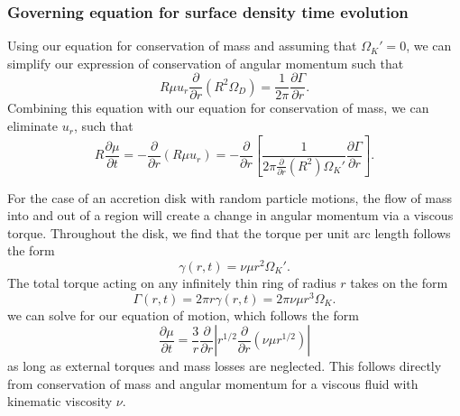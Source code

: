 \documentclass[aps,pra,twocolumn]{revtex4-1}
\begin{document}
\subsubsection{\label{section 2.1.3} Governing equation for surface density time evolution}
Using our equation for conservation of mass and assuming that $\Omega_K' = 0$, we can simplify our expression of conservation of angular momentum such that
\begin{equation}
R\mu u_r \frac{\partial}{\partial r} (R^2 \Omega_D) = \frac{1}{2\pi} \frac{\partial \Gamma}{\partial r}.
\end{equation}
Combining this equation with our equation for conservation of mass, we can eliminate $u_r$, such that
\begin{equation}
R \frac{\partial \mu}{\partial t} = -\frac{\partial}{\partial r}(R \mu u_r) = - \frac{\partial}{\partial r}\left[ \frac{1}{2\pi \frac{\partial}{\partial r}(R^2)\Omega_K'}\frac{\partial \Gamma}{\partial r} \right].
\end{equation}

For the case of an accretion disk with random particle motions, the flow of mass into and out of a region will create a change in angular momentum via a viscous torque.  Throughout the disk, we find that the torque per unit arc length follows the form \cite{king2002}
\begin{equation}
\gamma(r, t) = \nu \mu r^2 \Omega_K'.
\end{equation}
The total torque acting on any infinitely thin ring of radius $r$ takes on the form 
\begin{equation}
\Gamma(r, t) = 2 \pi r \gamma(r, t) = 2 \pi \nu \mu r^3 \Omega_K. \label{torque}
\end{equation}
we can solve for our equation of motion, which follows the form 
\begin{equation}
\frac{\partial \mu}{\partial t} = \frac{3}{r} \frac{\partial}{\partial r} \left| r^{1/2}\frac{\partial}{\partial r}\left( \nu \mu r^{1/2} \right) \right|
\end{equation}
as long as external torques and mass losses are neglected\cite{king2002, armitage2011}.  This follows directly from conservation of mass and angular momentum for a viscous fluid with kinematic viscosity $\nu$.
\end{document}
